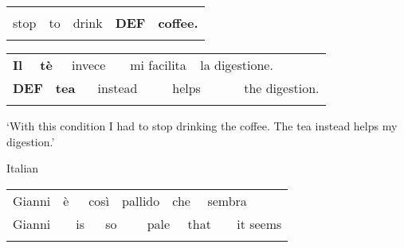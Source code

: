 \begin{tabular}{lllll}
\lsptoprule
\multicolumn{5}{l}{smettere

}\\
stop & to & drink & {\bfseries DEF} & {\bfseries coffee.}\\
\lspbottomrule
\end{tabular}

\begin{tabular}{llllllllll}
\lsptoprule
{\bfseries Il} & \multicolumn{2}{l}{{\bfseries tè}

} & \multicolumn{2}{l}{invece

} & \multicolumn{2}{l}{mi facilita

} & \multicolumn{2}{l}{la digestione.

} & \\
\multicolumn{2}{l}{{\bfseries DEF}

} & \multicolumn{2}{l}{{\bfseries tea}

} & \multicolumn{2}{l}{instead

} & \multicolumn{2}{l}{helps

} & \multicolumn{2}{l}{the digestion.

}\\
\lspbottomrule
\end{tabular}

\begin{styleTranslation}
‘With this condition I had to stop drinking the coffee. The tea instead helps my digestion.’

\end{styleTranslation}

\begin{listWWNumileveli}
\item 

\begin{styleExample}
\label{bkm:Ref172696628}Italian

\end{styleExample}

\end{listWWNumileveli}

\begin{tabular}{llllllllllll}
\lsptoprule
Gianni & \multicolumn{2}{l}{è

} & \multicolumn{2}{l}{così

} & \multicolumn{2}{l}{pallido

} & \multicolumn{2}{l}{che

} & \multicolumn{2}{l}{sembra

} & \\
\multicolumn{2}{l}{Gianni

} & \multicolumn{2}{l}{is

} & \multicolumn{2}{l}{so

} & \multicolumn{2}{l}{pale

} & \multicolumn{2}{l}{that

} & \multicolumn{2}{l}{it seems

}\\
\lspbottomrule
\end{tabular}

